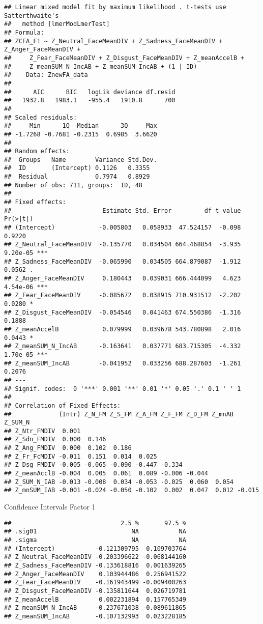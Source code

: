 \documentclass[
]{article}
\begin{document}
\begin{verbatim}
## Linear mixed model fit by maximum likelihood . t-tests use Satterthwaite's
##   method [lmerModLmerTest]
## Formula: 
## ZCFA_F1 ~ Z_Neutral_FaceMeanDIV + Z_Sadness_FaceMeanDIV + Z_Anger_FaceMeanDIV +  
##     Z_Fear_FaceMeanDIV + Z_Disgust_FaceMeanDIV + Z_meanAccelB +  
##     Z_meanSUM_N_IncAB + Z_meanSUM_IncAB + (1 | ID)
##    Data: ZnewFA_data
## 
##      AIC      BIC   logLik deviance df.resid 
##   1932.8   1983.1   -955.4   1910.8      700 
## 
## Scaled residuals: 
##     Min      1Q  Median      3Q     Max 
## -1.7268 -0.7681 -0.2315  0.6985  3.6620 
## 
## Random effects:
##  Groups   Name        Variance Std.Dev.
##  ID       (Intercept) 0.1126   0.3355  
##  Residual             0.7974   0.8929  
## Number of obs: 711, groups:  ID, 48
## 
## Fixed effects:
##                         Estimate Std. Error         df t value Pr(>|t|)    
## (Intercept)            -0.005803   0.058933  47.524157  -0.098   0.9220    
## Z_Neutral_FaceMeanDIV  -0.135770   0.034504 664.468854  -3.935 9.20e-05 ***
## Z_Sadness_FaceMeanDIV  -0.065990   0.034505 664.879087  -1.912   0.0562 .  
## Z_Anger_FaceMeanDIV     0.180443   0.039031 666.444099   4.623 4.54e-06 ***
## Z_Fear_FaceMeanDIV     -0.085672   0.038915 710.931512  -2.202   0.0280 *  
## Z_Disgust_FaceMeanDIV  -0.054546   0.041463 674.550386  -1.316   0.1888    
## Z_meanAccelB            0.079999   0.039678 543.780898   2.016   0.0443 *  
## Z_meanSUM_N_IncAB      -0.163641   0.037771 683.715305  -4.332 1.70e-05 ***
## Z_meanSUM_IncAB        -0.041952   0.033256 688.287603  -1.261   0.2076    
## ---
## Signif. codes:  0 '***' 0.001 '**' 0.01 '*' 0.05 '.' 0.1 ' ' 1
## 
## Correlation of Fixed Effects:
##             (Intr) Z_N_FM Z_S_FM Z_A_FM Z_F_FM Z_D_FM Z_mnAB Z_SUM_N
## Z_Ntr_FMDIV  0.001                                                  
## Z_Sdn_FMDIV  0.000  0.146                                           
## Z_Ang_FMDIV  0.000  0.102  0.186                                    
## Z_Fr_FcMDIV -0.011  0.151  0.014  0.025                             
## Z_Dsg_FMDIV -0.005 -0.065 -0.090 -0.447 -0.334                      
## Z_meanAcclB -0.004  0.005  0.061  0.089 -0.006 -0.044               
## Z_SUM_N_IAB -0.013 -0.008  0.034 -0.053 -0.025  0.060  0.054        
## Z_mnSUM_IAB -0.001 -0.024 -0.050 -0.102  0.002  0.047  0.012 -0.015
\end{verbatim}

Confidence Intervals Factor 1

\begin{verbatim}
##                              2.5 %       97.5 %
## .sig01                          NA           NA
## .sigma                          NA           NA
## (Intercept)           -0.121309795  0.109703764
## Z_Neutral_FaceMeanDIV -0.203396622 -0.068144160
## Z_Sadness_FaceMeanDIV -0.133618816  0.001639265
## Z_Anger_FaceMeanDIV    0.103944486  0.256941522
## Z_Fear_FaceMeanDIV    -0.161943499 -0.009400263
## Z_Disgust_FaceMeanDIV -0.135811644  0.026719781
## Z_meanAccelB           0.002231894  0.157765349
## Z_meanSUM_N_IncAB     -0.237671038 -0.089611865
## Z_meanSUM_IncAB       -0.107132993  0.023228185
\end{verbatim}
\end{document}
